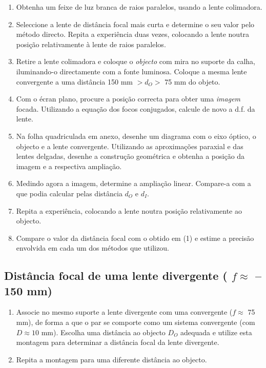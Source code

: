 \documentclass[a4paper,twoside,11pt]{report}      %
\begin{document}
\begin{enumerate}
\item Obtenha  um  feixe  de  luz  branca  de  raios  paralelos, usando a lente colimadora.
\item Seleccione a lente de distância focal mais curta e determine o seu valor pelo método directo.  Repita  a  experiência  duas  vezes,  colocando  a  lente 
noutra posição relativamente à lente de raios paralelos. 
\item Retire a lente colimadora e coloque o \emph{objecto} com mira no suporte da calha, iluminando-o directamente com a fonte luminosa. Coloque a mesma lente convergente a uma distância 150 mm $> d_O >$ 75 mm do objeto.

\item Com o écran plano, procure a posição correcta para obter uma \emph{imagem} focada.
Utilizando a equação dos focos conjugados, calcule de novo a d.f. da lente. 
\item Na folha quadriculada em anexo, desenhe um diagrama com o eixo óptico, o objecto e a lente convergente. Utilizando as aproximações paraxial e das lentes delgadas, desenhe a construção geométrica e obtenha a posição da imagem e a respectiva ampliação.

\item Medindo agora a imagem, determine a ampliação linear. Compare-a com a que podia  calcular pelas distância $d_O$  e $d_I$. 
\item Repita a experiência, colocando a lente noutra posição relativamente ao objecto.  
\item Compare o valor da distância focal com o obtido em (1) e estime a precisão envolvida em 
cada um dos métodos que utilizou. 
\end{enumerate}

\subsection{\sf   Distância focal de uma lente divergente ( $f  \approx$ --150 mm) }
\begin{enumerate}
\item Associe  no  mesmo  suporte  a  lente  divergente  com  uma  convergente ($f  \approx$ 75 mm), de  forma a  que  o 
par se comporte como um sistema convergente (com $D\approx 10$ mm). Escolha uma distância ao objecto $D_O$ adequada e utilize esta montagem para determinar a distância focal da lente divergente.
\item Repita a montagem para uma diferente distância ao objecto. 
\end{enumerate}
\end{document}
